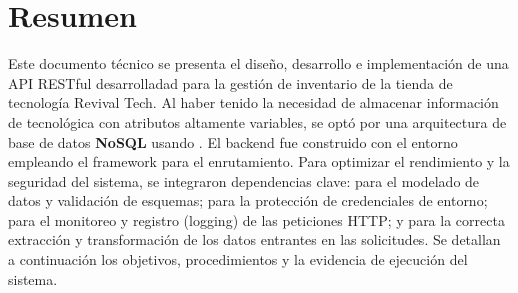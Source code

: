 \chapter{Resumen}
Este documento técnico se presenta el diseño, desarrollo e implementación de una API RESTful desarrolladad para la gestión de inventario de la tienda de tecnología Revival Tech. Al haber tenido la necesidad de almacenar información de tecnológica con atributos altamente variables, se optó por una arquitectura de base de datos \textbf{NoSQL} usando . El backend fue construido con el entorno  empleando el framework  para el enrutamiento. Para optimizar el rendimiento y la seguridad del sistema, se integraron dependencias clave:  para el modelado de datos y validación de esquemas;  para la protección de credenciales de entorno;  para el monitoreo y registro (logging) de las peticiones HTTP; y  para la correcta extracción y transformación de los datos entrantes en las solicitudes. Se detallan a continuación los objetivos, procedimientos y la evidencia de ejecución del sistema.